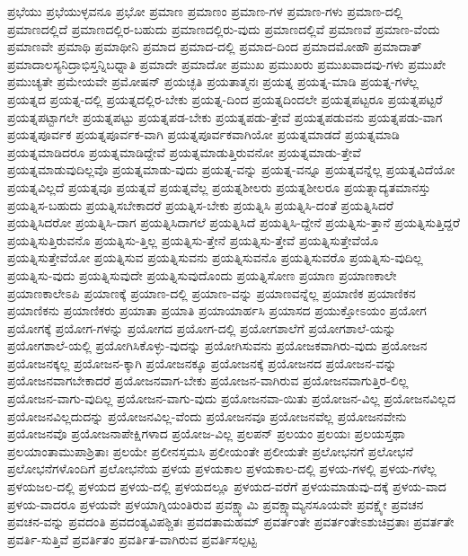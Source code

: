 {ಪ್ರಭೆಯು
ಪ್ರಭೆಯುಳ್ಳವನೂ
ಪ್ರಭೋ
ಪ್ರಮಾಣ
ಪ್ರಮಾಣಂ
ಪ್ರಮಾಣ-ಗಳ
ಪ್ರಮಾಣ-ಗಳು
ಪ್ರಮಾಣ-ದಲ್ಲಿ
ಪ್ರಮಾಣದಲ್ಲಿದೆ
ಪ್ರಮಾಣದಲ್ಲಿರ-ಬಹುದು
ಪ್ರಮಾಣದಲ್ಲಿರು-ವುದು
ಪ್ರಮಾಣದಲ್ಲಿವೆ
ಪ್ರಮಾಣವೆ
ಪ್ರಮಾಣ-ವೆಂದು
ಪ್ರಮಾಣವೇ
ಪ್ರಮಾಥಿ
ಪ್ರಮಾಥೀನಿ
ಪ್ರಮಾದ
ಪ್ರಮಾದ-ದಲ್ಲಿ
ಪ್ರಮಾದ-ದಿಂದ
ಪ್ರಮಾದಮೋಹೌ
ಪ್ರಮಾದಾತ್
ಪ್ರಮಾದಾಲಸ್ಯನಿದ್ರಾಭಿಸ್ತನ್ನಿಬಧ್ನಾತಿ
ಪ್ರಮಾದೇ
ಪ್ರಮಾದೋ
ಪ್ರಮುಖ
ಪ್ರಮುಖರು
ಪ್ರಮುಖವಾದವು-ಗಳು
ಪ್ರಮುಖೇ
ಪ್ರಮುಚ್ಯತೇ
ಪ್ರಮೇಯವೇ
ಪ್ರಮೋಷನ್
ಪ್ರಯಚ್ಛತಿ
ಪ್ರಯತಾತ್ಮನಃ
ಪ್ರಯತ್ನ
ಪ್ರಯತ್ನ-ಮಾಡಿ
ಪ್ರಯತ್ನ-ಗಳೆಲ್ಲ
ಪ್ರಯತ್ನದ
ಪ್ರಯತ್ನ-ದಲ್ಲಿ
ಪ್ರಯತ್ನದಲ್ಲಿರ-ಬೇಕು
ಪ್ರಯತ್ನ-ದಿಂದ
ಪ್ರಯತ್ನದಿಂದಲೇ
ಪ್ರಯತ್ನಪಟ್ಟರೂ
ಪ್ರಯತ್ನಪಟ್ಟರೆ
ಪ್ರಯತ್ನಪಟ್ಟಾಗಲೇ
ಪ್ರಯತ್ನಪಟ್ಟು
ಪ್ರಯತ್ನಪಡ-ಬೇಕು
ಪ್ರಯತ್ನಪಡು-ತ್ತೇವೆ
ಪ್ರಯತ್ನಪಡುವನು
ಪ್ರಯತ್ನಪಡು-ವಾಗ
ಪ್ರಯತ್ನಪೂರ್ವಕ
ಪ್ರಯತ್ನಪೂರ್ವಕ-ವಾಗಿ
ಪ್ರಯತ್ನಪೂರ್ವಕವಾಗಿಯೋ
ಪ್ರಯತ್ನಮಾಡದೆ
ಪ್ರಯತ್ನಮಾಡಿ
ಪ್ರಯತ್ನಮಾಡಿದರೂ
ಪ್ರಯತ್ನಮಾಡಿದ್ದೇವೆ
ಪ್ರಯತ್ನಮಾಡುತ್ತಿರುವನೋ
ಪ್ರಯತ್ನಮಾಡು-ತ್ತೇವೆ
ಪ್ರಯತ್ನಮಾಡುವುದಿಲ್ಲವೊ
ಪ್ರಯತ್ನಮಾಡು-ವುದು
ಪ್ರಯತ್ನ-ವನ್ನು
ಪ್ರಯತ್ನ-ವನ್ನೂ
ಪ್ರಯತ್ನವನ್ನೆಲ್ಲ
ಪ್ರಯತ್ನವಿದೆಯೋ
ಪ್ರಯತ್ನವಿಲ್ಲದೆ
ಪ್ರಯತ್ನವೂ
ಪ್ರಯತ್ನವೆ
ಪ್ರಯತ್ನವೆಲ್ಲ
ಪ್ರಯತ್ನಶೀಲರು
ಪ್ರಯತ್ನಶೀಲರೂ
ಪ್ರಯತ್ನಾದ್ಯತಮಾನಸ್ತು
ಪ್ರಯತ್ನಿಸ-ಬಹುದು
ಪ್ರಯತ್ನಿಸಬೇಕಾದರೆ
ಪ್ರಯತ್ನಿಸ-ಬೇಕು
ಪ್ರಯತ್ನಿಸಿ
ಪ್ರಯತ್ನಿಸಿ-ದಂತೆ
ಪ್ರಯತ್ನಿಸಿದರೆ
ಪ್ರಯತ್ನಿಸಿದರೋ
ಪ್ರಯತ್ನಿಸಿ-ದಾಗ
ಪ್ರಯತ್ನಿಸಿದಾಗಲೆ
ಪ್ರಯತ್ನಿಸಿದೆ
ಪ್ರಯತ್ನಿಸಿ-ದ್ದೇನೆ
ಪ್ರಯತ್ನಿಸು-ತ್ತಾನೆ
ಪ್ರಯತ್ನಿಸುತ್ತಿದ್ದರೆ
ಪ್ರಯತ್ನಿಸುತ್ತಿರುವನೊ
ಪ್ರಯತ್ನಿಸು-ತ್ತಿಲ್ಲ
ಪ್ರಯತ್ನಿಸು-ತ್ತೇನೆ
ಪ್ರಯತ್ನಿಸು-ತ್ತೇವೆ
ಪ್ರಯತ್ನಿಸುತ್ತೇವೆಯೊ
ಪ್ರಯತ್ನಿಸುತ್ತೇವೆಯೋ
ಪ್ರಯತ್ನಿಸುವ
ಪ್ರಯತ್ನಿಸುವನು
ಪ್ರಯತ್ನಿಸುವನೊ
ಪ್ರಯತ್ನಿಸುವರೊ
ಪ್ರಯತ್ನಿಸು-ವುದಿಲ್ಲ
ಪ್ರಯತ್ನಿಸು-ವುದು
ಪ್ರಯತ್ನಿಸುವುದೇ
ಪ್ರಯತ್ನಿಸುವುದೊಂದು
ಪ್ರಯತ್ನಿಸೋಣ
ಪ್ರಯಾಣ
ಪ್ರಯಾಣಕಾಲೇ
ಪ್ರಯಾಣಕಾಲೇಽಪಿ
ಪ್ರಯಾಣಕ್ಕೆ
ಪ್ರಯಾಣ-ದಲ್ಲಿ
ಪ್ರಯಾಣ-ವನ್ನು
ಪ್ರಯಾಣವನ್ನೆಲ್ಲ
ಪ್ರಯಾಣಿಕ
ಪ್ರಯಾಣಿಕನ
ಪ್ರಯಾಣಿಕನು
ಪ್ರಯಾಣಿಕರು
ಪ್ರಯಾತಾ
ಪ್ರಯಾತಿ
ಪ್ರಯಾಯಾರ್ಹಸಿ
ಪ್ರಯಾಸದ
ಪ್ರಯುಕ್ತೋಽಯಂ
ಪ್ರಯೋಗ
ಪ್ರಯೋಗಕ್ಕೆ
ಪ್ರಯೋಗ-ಗಳನ್ನು
ಪ್ರಯೋಗದ
ಪ್ರಯೋಗ-ದಲ್ಲಿ
ಪ್ರಯೋಗಶಾಲೆಗೆ
ಪ್ರಯೋಗಶಾಲೆ-ಯನ್ನು
ಪ್ರಯೋಗಶಾಲೆ-ಯಲ್ಲಿ
ಪ್ರಯೋಗಿಸಿಕೊಳ್ಳು-ವುದನ್ನು
ಪ್ರಯೋಗಿಸುವನು
ಪ್ರಯೋಜಕವಾಗಿರು-ವುದು
ಪ್ರಯೋಜನ
ಪ್ರಯೋಜನಕ್ಕಲ್ಲ
ಪ್ರಯೋಜನ-ಕ್ಕಾಗಿ
ಪ್ರಯೋಜನಕ್ಕೂ
ಪ್ರಯೋಜನಕ್ಕೆ
ಪ್ರಯೋಜನದ
ಪ್ರಯೋಜನ-ವನ್ನು
ಪ್ರಯೋಜನವಾಗಬೇಕಾದರೆ
ಪ್ರಯೋಜನವಾಗ-ಬೇಕು
ಪ್ರಯೋಜನ-ವಾಗಿರುವ
ಪ್ರಯೋಜನವಾಗುತ್ತಿರ-ಲಿಲ್ಲ
ಪ್ರಯೋಜನ-ವಾಗು-ವುದಿಲ್ಲ
ಪ್ರಯೋಜನ-ವಾಗು-ವುದು
ಪ್ರಯೋಜನವಾ-ಯಿತು
ಪ್ರಯೋಜನ-ವಿಲ್ಲ
ಪ್ರಯೋಜನವಿಲ್ಲದ
ಪ್ರಯೋಜನವಿಲ್ಲದುದನ್ನು
ಪ್ರಯೋಜನವಿಲ್ಲ-ವೆಂದು
ಪ್ರಯೋಜನವೂ
ಪ್ರಯೋಜನವೆಲ್ಲ
ಪ್ರಯೋಜನವೇನು
ಪ್ರಯೋಜನವೊ
ಪ್ರಯೋಜನಾಪೇಕ್ಷಿಗಳಾದ
ಪ್ರಯೋಜ-ವಿಲ್ಲ
ಪ್ರಲಪನ್
ಪ್ರಲಯಂ
ಪ್ರಲಯಃ
ಪ್ರಲಯಸ್ತಥಾ
ಪ್ರಲಯಾಂತಾಮುಪಾಶ್ರಿತಾಃ
ಪ್ರಲಯೇ
ಪ್ರಲೀನಸ್ತಮಸಿ
ಪ್ರಲೀಯಂತೇ
ಪ್ರಲೀಯತೇ
ಪ್ರಲೋಭನಗೆ
ಪ್ರಲೋಭನೆ
ಪ್ರಲೋಭನೆಗಳೊಂದಿಗೆ
ಪ್ರಲೋಭನೆಯ
ಪ್ರಳಯ
ಪ್ರಳಯಕಾಲ
ಪ್ರಳಯಕಾಲ-ದಲ್ಲಿ
ಪ್ರಳಯ-ಗಳಲ್ಲಿ
ಪ್ರಳಯ-ಗಳೆಲ್ಲ
ಪ್ರಳಯಜಲ-ದಲ್ಲಿ
ಪ್ರಳಯದ
ಪ್ರಳಯ-ದಲ್ಲಿ
ಪ್ರಳಯದಲ್ಲೂ
ಪ್ರಳಯದ-ವರೆಗೆ
ಪ್ರಳಯಮಾಡುವು-ದಕ್ಕೆ
ಪ್ರಳಯ-ವಾದ
ಪ್ರಳಯ-ವಾದರೂ
ಪ್ರಳಯವೇ
ಪ್ರಳಯಾಗ್ನಿಯಂತಿರುವ
ಪ್ರವಕ್ಷ್ಯಾಮಿ
ಪ್ರವಕ್ಷ್ಯಾಮ್ಯನಸೂಯವೇ
ಪ್ರವಕ್ಷ್ಯೇ
ಪ್ರವಚನ
ಪ್ರವಚನ-ವನ್ನು
ಪ್ರವದಂತಿ
ಪ್ರವದಂತ್ಯವಿಪಶ್ಚಿತಃ
ಪ್ರವದತಾಮಹಮ್
ಪ್ರವರ್ತಂತೇ
ಪ್ರವರ್ತಂತೇಽಶುಚಿವ್ರತಾಃ
ಪ್ರವರ್ತತೇ
ಪ್ರವರ್ತಿ-ಸುತ್ತಿವೆ
ಪ್ರವರ್ತಿತಂ
ಪ್ರವರ್ತಿತ-ವಾಗಿರುವ
ಪ್ರವರ್ತಿಸಲ್ಪಟ್ಟ
}
